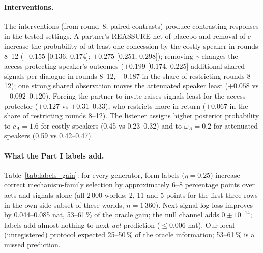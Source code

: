 \documentclass[runningheads]{llncs}
\begin{document}
\paragraph{Interventions.} The interventions (from round~8; paired contrasts) produce contrasting responses in the tested settings. A partner's REASSURE net of placebo and removal of $c$ increase the probability of at least one concession by the costly speaker in rounds 8--12 ($+0.155$ [0.136, 0.174]; $+0.275$ [0.251, 0.298]); removing $\gamma$ changes the access-protecting speaker's outcomes ($+0.199$ [0.174, 0.225] additional shared signals per dialogue in rounds 8--12, $-0.187$ in the share of restricting rounds 8--12); one strong shared observation moves the attenuated speaker least ($+0.058$ vs $+0.092$--$0.120$). Forcing the partner to invite raises signals least for the access protector ($+0.127$ vs $+0.31$--$0.33$), who restricts more in return ($+0.067$ in the share of restricting rounds 8--12). The listener assigns higher posterior probability to $c_A=1.6$ for costly speakers (0.45 vs 0.23--0.32) and to $\omega_A=0.2$ for attenuated speakers (0.59 vs 0.42--0.47).

\paragraph{What the Part I labels add.} Table~\ref{tab:labels_gain}: for every generator, form labels ($\eta=0.25$) increase correct mechanism-family selection by approximately 6--8 percentage points over acts and signals alone (all 2\,000 worlds; 2, 11 and 5 points for the first three rows in the own-side subset of these worlds, $n=1\,360$). Next-signal log loss improves by 0.044--0.085 nat, 53--61\,\% of the oracle gain; the null channel adds $0\pm10^{-14}$; labels add almost nothing to next-\emph{act} prediction ($\le0.006$ nat). Our local (unregistered) protocol expected 25--50\,\% of the oracle information; 53--61\,\% is a missed prediction.
\end{document}
